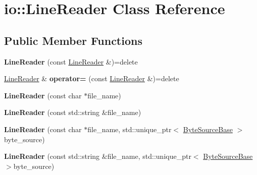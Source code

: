 \hypertarget{classio_1_1_line_reader}{}\section{io\+:\+:Line\+Reader Class Reference}
\label{classio_1_1_line_reader}
\subsection*{Public Member Functions}
\begin{DoxyCompactItemize}
\item 
{\bfseries Line\+Reader} (const \hyperlink{classio_1_1_line_reader}{Line\+Reader} \&)=delete\hypertarget{classio_1_1_line_reader_a84f2957de769bb701eaaddfd8bc004dd}{}\label{classio_1_1_line_reader_a84f2957de769bb701eaaddfd8bc004dd}

\item 
\hyperlink{classio_1_1_line_reader}{Line\+Reader} \& {\bfseries operator=} (const \hyperlink{classio_1_1_line_reader}{Line\+Reader} \&)=delete\hypertarget{classio_1_1_line_reader_a9ebd7beca16060ffc0ea8df3c0c6ff25}{}\label{classio_1_1_line_reader_a9ebd7beca16060ffc0ea8df3c0c6ff25}

\item 
{\bfseries Line\+Reader} (const char $\ast$file\+\_\+name)\hypertarget{classio_1_1_line_reader_a81a75d3f53725d35822f490007520e29}{}\label{classio_1_1_line_reader_a81a75d3f53725d35822f490007520e29}

\item 
{\bfseries Line\+Reader} (const std\+::string \&file\+\_\+name)\hypertarget{classio_1_1_line_reader_ab0eb26f44fa6b18f9c39dfb2561ac882}{}\label{classio_1_1_line_reader_ab0eb26f44fa6b18f9c39dfb2561ac882}

\item 
{\bfseries Line\+Reader} (const char $\ast$file\+\_\+name, std\+::unique\+\_\+ptr$<$ \hyperlink{classio_1_1_byte_source_base}{Byte\+Source\+Base} $>$byte\+\_\+source)\hypertarget{classio_1_1_line_reader_af4ebb130a7d6c78356573f6d0304266c}{}\label{classio_1_1_line_reader_af4ebb130a7d6c78356573f6d0304266c}

\item 
{\bfseries Line\+Reader} (const std\+::string \&file\+\_\+name, std\+::unique\+\_\+ptr$<$ \hyperlink{classio_1_1_byte_source_base}{Byte\+Source\+Base} $>$byte\+\_\+source)\hypertarget{classio_1_1_line_reader_ab625b3a8001dca811b0e211c6cfc1b28}{}\label{classio_1_1_line_reader_ab625b3a8001dca811b0e211c6cfc1b28}


\end{DoxyCompactItemize}

